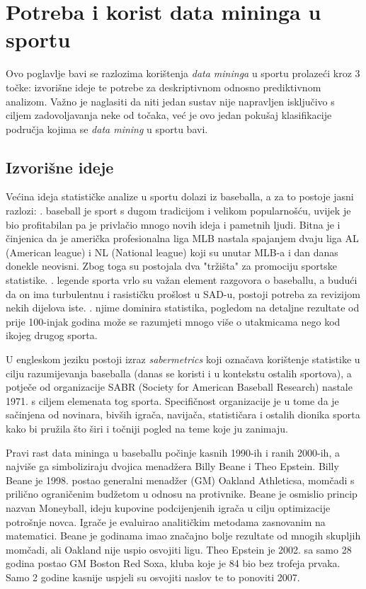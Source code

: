 \documentclass{ferseminar}
\begin{document}
\section{Potreba i korist data mininga u sportu}

Ovo poglavlje bavi se razlozima korištenja \textit{data mininga} u sportu prolazeći kroz 3 točke: izvorišne ideje te potrebe za deskriptivnom odnosno prediktivnom analizom. Važno je naglasiti da niti jedan sustav nije napravljen isključivo s ciljem zadovoljavanja neke od točaka, već je ovo jedan pokušaj klasifikacije područja kojima se \textit{data mining} u sportu bavi.

\subsection{Izvorišne ideje}
Većina ideja statističke analize u sportu dolazi iz baseballa, a za to postoje jasni razlozi:
. baseball je sport s dugom tradicijom i velikom popularnošću, uvijek je bio profitabilan pa je privlačio mnogo novih ideja i pametnih ljudi. Bitna je i činjenica da je američka profesionalna liga MLB nastala spajanjem dvaju liga AL (American league) i NL (National league) koji su unutar MLB-a i dan danas donekle neovisni. Zbog toga su postojala dva "tržišta" za promociju sportske statistike.
. legende sporta vrlo su važan element razgovora o baseballu, a budući da on ima turbulentnu i rasističku prošlost u SAD-u, postoji potreba za revizijom nekih dijelova iste.
. njime dominira statistika, pogledom na detaljne rezultate od prije 100-injak godina može se razumjeti mnogo više o utakmicama nego kod ikojeg drugog sporta.
\newline

U engleskom jeziku postoji izraz \textit{sabermetrics} koji označava korištenje statistike u cilju razumijevanja baseballa (danas se koristi i u kontekstu ostalih sportova), a potječe od organizacije SABR (Society for American Baseball Research) nastale 1971. s ciljem elemenata tog sporta. Specifičnost organizacije je u tome da je sačinjena od novinara, bivših igrača, navijača, statističara i ostalih dionika sporta kako bi pružila što širi i točniji pogled na teme koje ju zanimaju.

Pravi rast data mininga u baseballu počinje kasnih 1990-ih i ranih 2000-ih, a najviše ga simboliziraju dvojica menadžera Billy Beane i Theo Epstein. Billy Beane je 1998. postao generalni menadžer (GM) Oakland Athleticsa, momčadi s prilično ograničenim budžetom u odnosu na protivnike. Beane je osmislio princip nazvan Moneyball, ideju kupovine podcijenjenih igrača u cilju optimizacije potrošnje novca. Igrače je evaluirao analitičkim metodama zasnovanim na matematici. Beane je godinama imao značajno bolje rezultate od mnogih skupljih momčadi, ali Oakland nije uspio osvojiti ligu. Theo Epstein je 2002. sa samo 28 godina postao GM Boston Red Soxa, kluba koje je 84 bio bez trofeja prvaka. Samo 2 godine kasnije uspjeli su osvojiti naslov te to ponoviti 2007.
\end{document}
